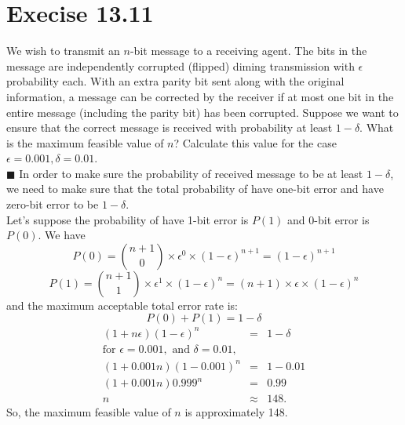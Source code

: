 \documentclass{article}
\newcommand{\solution}[1]{~\\ $\blacksquare$ \sffamily\upshape\selectfont #1
\normalfont ~\\~ }
\begin{document}
\section{Execise 13.11}
We wish to transmit an $n$-bit message to a receiving agent. The bits
in the message are independently corrupted (flipped) diming
transmission with $\epsilon$ probability each. With an extra parity
bit sent along with the original information, a message can be
corrected by the receiver if at most one bit in the entire message
(including the parity bit) has been corrupted. Suppose we want to
ensure that the correct message is received with probability at least
$1-\delta$. What is the maximum feasible value of $n$? Calculate this
value for the case $\epsilon = 0.001, \delta = 0.01$.
\solution{
  In order to make sure the probability of received message to be at
  least $1-\delta$, we need to make sure that the total probability of
  have one-bit error and have zero-bit error to be $1-\delta$. \\
  Let's suppose the probability of have 1-bit error is $P(1)$ and 0-bit
  error is $P(0)$. We have 
  \[ P(0) = {n+1 \choose 0}\times \epsilon ^{0}\times (1-\epsilon)^{n+1}
  = (1-\epsilon)^{n+1} \]
  \[ P(1) = {n+1 \choose 1}\times \epsilon ^{1}\times (1-\epsilon)^{n}
  = (n+1)\times \epsilon \times (1-\epsilon)^n \]
  and the maximum acceptable total error rate is: 
  \[ P(0) + P(1) = 1 - \delta \]
\begin{eqnarray*}
  (1+n\epsilon)(1-\epsilon)^n & = & 1-\delta \\
  \mbox{for } \epsilon = 0.001, \mbox{ and } \delta =  0.01, && \\
  (1+0.001n)(1-0.001)^n & = & 1-0.01 \\
  (1+0.001n)0.999^n & = & 0.99  \\
  n & \approx & 148. 
\end{eqnarray*}
  So, the maximum feasible value of $n$ is approximately 148. 
}
\end{document}
